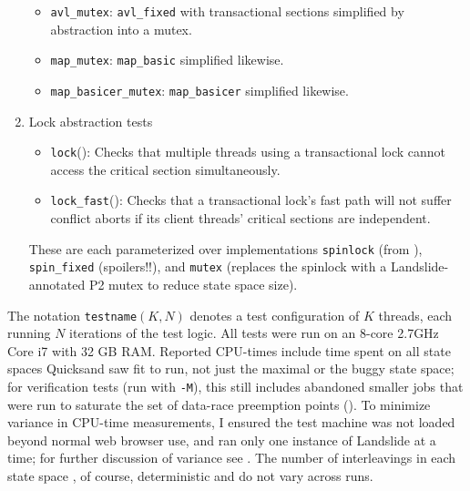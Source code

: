 \begin{enumerate}
\begin{itemize}
		\item {\tt avl\_mutex}: {\tt avl\_fixed} with transactional sections simplified by abstraction into a mutex.
		\item {\tt map\_mutex}: {\tt map\_basic} simplified likewise.
		\item {\tt map\_basicer\_mutex}: {\tt map\_basicer} simplified likewise.
	\end{itemize}
	\item Lock abstraction tests
	\begin{itemize}
		\item {\tt lock}(): Checks that multiple threads using a transactional lock
			cannot access the critical section simultaneously.
		\item {\tt lock\_fast}(): Checks that a transactional lock's fast path will not suffer conflict aborts
			if its client threads' critical sections are independent.
	\end{itemize}
		These are each parameterized over implementations {\tt spinlock} (from \cite{spinlock-rtm-github}),
		{\tt spin\_\allowbreak{}fixed} (spoilers!!),
		and {\tt mutex} (replaces the spinlock with a Landslide-annotated P2 mutex to reduce state space size).
\end{enumerate}

The notation {\tt testname}$(K,N)$ %
denotes a test configuration of $K$ threads, each running $N$ iterations of the test logic.
All tests were run on an 8-core 2.7GHz Core i7 with 32 GB RAM.
Reported CPU-times include time spent on all state spaces
Quicksand saw fit to run,
not just the maximal or the buggy state space;
for verification tests (run with {\tt -M}),
this still includes abandoned smaller jobs that were run to saturate the set of data-race preemption points
().
To minimize variance in CPU-time measurements,
I ensured the test machine was not loaded beyond normal web browser use,
and ran only one instance of Landslide at a time;
for further discussion of variance see \cite{sigbovik-htm}.
The number of interleavings in each state space , of course, deterministic and do not vary across runs.

